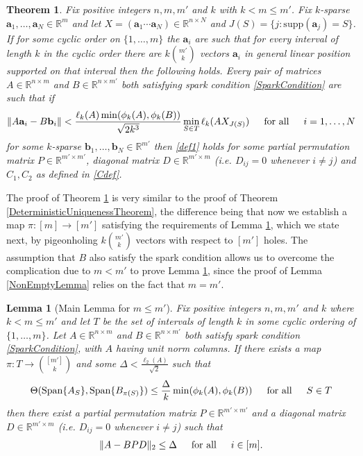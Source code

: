 \documentclass[journal, onecolumn]{IEEEtran}
\newtheorem{theorem}{Theorem}
\newtheorem{lemma}{Lemma}
\begin{document}
\begin{theorem}\label{DeterministicUniquenessTheorem2}
Fix positive integers $n, m, m'$ and $k$ with $k < m \leq m'$. Fix $k$-sparse $\mathbf{a}_1, \ldots, \mathbf{a}_N \in \mathbb{R}^m$ and let $X  = (\mathbf{a}_1 \cdots \mathbf{a}_N) \in \mathbb{R}^{n \times N}$ and $J(S) = \{j : \text{supp}(\mathbf{a}_j) = S\}$. If for some cyclic order on $\{1, \ldots, m\}$ the $\mathbf{a}_i$ are such that for every interval of length $k$ in the cyclic order there are $k{m' \choose k}$ vectors $\mathbf{a}_i$ in general linear position supported on that interval then the following holds. Every pair of matrices $A \in \mathbb{R}^{n \times m}$ and $B \in \mathbb{R}^{n \times m'}$ both satisfying spark condition \eqref{SparkCondition} are such that if 
\begin{align}
\|A\mathbf{a}_i - B\mathbf{b}_i\| < \frac{ \ell_{k}(A) \min(\phi_k(A), \phi_k(B))}{\sqrt{2k^3} } \min_{S \in T} \ell_k(AX_{J(S)}) \indent \text{for all} \indent i = 1, \ldots, N
\end{align}
%
for some $k$-sparse $\mathbf{b}_1, \ldots, \mathbf{b}_N \in \mathbb{R}^{m'}$ then \eqref{def1} holds for some partial permutation matrix $P \in \mathbb{R}^{m' \times m'}$, diagonal matrix $D \in \mathbb{R}^{m' \times m}$ (i.e. $D_{ij} = 0$ whenever $i \neq j$) and $C_1, C_2$ as defined in \eqref{Cdef}. 
\end{theorem}

The proof of Theorem \ref{DeterministicUniquenessTheorem2} is very similar to the proof of Theorem \ref{DeterministicUniquenessTheorem}, the difference being that now we establish a map $\pi: [m] \to [m']$ satisfying the requirements of Lemma \ref{MainLemma2}, which we state next, by pigeonholing $k{m' \choose k}$ vectors with respect to $[m']$ holes. The assumption that $B$ also satisfy the spark condition allows us to overcome the complication due to $m < m'$ to prove Lemma \ref{MainLemma2}, since the proof of Lemma \ref{NonEmptyLemma} relies on the fact that $m = m'$. 

\begin{lemma}[Main Lemma for $m \leq m'$]\label{MainLemma2}
Fix positive integers $n, m, m'$ and $k$ where $k < m \leq m'$ and let $T$ be the set of intervals of length $k$ in some cyclic ordering of $\{1, \ldots, m\}$. Let $A \in \mathbb{R}^{n \times m}$ and $B \in \mathbb{R}^{n \times m'}$ both satisfy spark condition \eqref{SparkCondition}, with $A$ having unit norm columns. If there exists a map $\pi: T \to {[m'] \choose k}$ and some $\Delta < \frac{\ell_{2}(A)}{\sqrt{2}}$ such that 
\begin{equation}\label{GapUpperBound2}
\Theta(\text{Span}\{A_{S}\}, \text{Span}\{B_{\pi(S)}\}) \leq \frac{ \Delta }{k} \min(\phi_k(A), \phi_k(B)) \indent \text{for all} \indent S \in T
\end{equation}
%
then there exist a partial permutation matrix $P \in \mathbb{R}^{m' \times m'}$ and a diagonal matrix $D \in \mathbb{R}^{m' \times m}$ (i.e. $D_{ij} = 0$ whenever $i \neq j$) such that
\begin{align}
\|A - BPD\|_2 \leq \Delta \indent \text{for all} \indent i \in [m].
\end{align}
\end{lemma}
\end{document}
